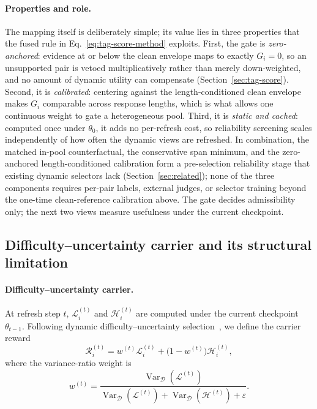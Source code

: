 \paragraph{Properties and role.}
The mapping itself is deliberately simple; its value lies in three
properties that the fused rule in Eq.~\eqref{eq:tag-score-method}
exploits. First, the gate is \emph{zero-anchored}: evidence at or
below the clean envelope maps to exactly \(G_i=0\), so an
unsupported pair is vetoed multiplicatively rather than merely
down-weighted, and no amount of dynamic utility can compensate
(Section~\ref{sec:tag-score}). Second, it is \emph{calibrated}:
centering against the length-conditioned clean envelope makes
\(G_i\) comparable across response lengths, which is what allows
one continuous weight to gate a heterogeneous pool. Third, it is
\emph{static and cached}: computed once under \(\theta_0\), it adds
no per-refresh cost, so reliability screening scales independently
of how often the dynamic views are refreshed. In combination, the
matched in-pool counterfactual, the conservative span minimum, and
the zero-anchored length-conditioned calibration form a
pre-selection reliability stage that existing dynamic selectors
lack (Section~\ref{sec:related}); none of the three components
requires per-pair labels, external judges, or selector training
beyond the one-time clean-reference calibration above. The gate decides
admissibility only; the next two views measure usefulness under the
current checkpoint.

\subsection{Difficulty--uncertainty carrier and its structural
limitation}
\label{sec:method-motivation}

\paragraph{Difficulty--uncertainty carrier.}
At refresh step \(t\), \(\mathcal{L}_i^{(t)}\) and
\(\mathcal{H}_i^{(t)}\) are computed under the current checkpoint
\(\theta_{t-1}\). Following dynamic difficulty--uncertainty
selection~\cite{kung2023activeit,dataagent}, we define the carrier
reward
\begin{equation}
  \mathcal{R}_i^{(t)}
  =
  w^{(t)}\mathcal{L}_i^{(t)}
  +
  \bigl(1-w^{(t)}\bigr)\mathcal{H}_i^{(t)},
  \label{eq:composite}
\end{equation}
where the variance-ratio weight is
\begin{equation}
  w^{(t)}
  =
  \frac{\operatorname{Var}_{\mathcal D}(\mathcal L^{(t)})}
       {\operatorname{Var}_{\mathcal D}(\mathcal L^{(t)})
       +
        \operatorname{Var}_{\mathcal D}(\mathcal H^{(t)})
       +
        \varepsilon}.
  \label{eq:w}
\end{equation}
